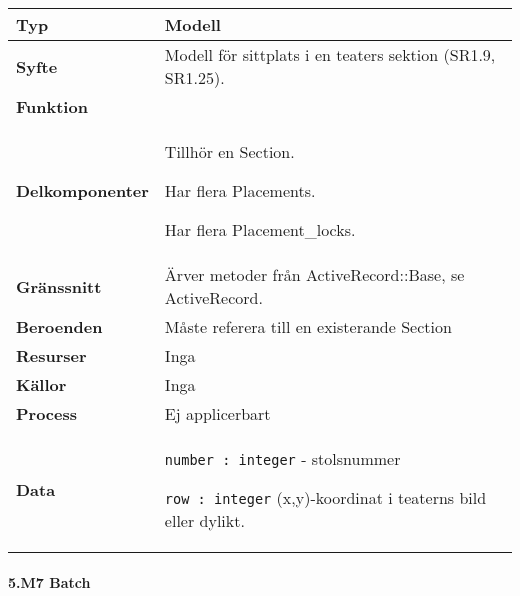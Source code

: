 \documentclass[a4paper, twoside, 11pt, titlepage]{article}
\begin{document}
			\begin {table} [ht] \begin{tabular} {  p{3.5cm} p{11.6cm} }
				\hline
				{\sffamily\textbf{Typ}} & {Modell} \\
				\hline
				{\sffamily\textbf{Syfte}} & {Modell för sittplats i en teaters sektion (SR1.9, SR1.25).} \\
				\hline
				{\sffamily\textbf{Funktion}} & { } \\
				\hline
				{\sffamily\textbf{Delkomponenter}} & {Tillhör en Section.

Har flera Placements.

Har flera Placement\_locks.} \\
				\hline
				{\sffamily\textbf{Gränssnitt}} & {Ärver metoder från ActiveRecord::Base, se ActiveRecord.} \\
				\hline
				{\sffamily\textbf{Beroenden}} & {Måste referera till en existerande Section} \\
				\hline
				{\sffamily\textbf{Resurser}} & {Inga} \\
				\hline
				{\sffamily\textbf{Källor}} & {Inga} \\
				\hline
				{\sffamily\textbf{Process}} & {Ej applicerbart} \\
				\hline
				{\sffamily\textbf{Data}} & {{\tt number : integer} - stolsnummer

{\tt row : integer} (x,y)-koordinat i teaterns bild eller dylikt.} \\
				\hline
			\end{tabular} \end{table} \FloatBarrier


			\paragraph{5.M7 Batch}\
\end{document}
